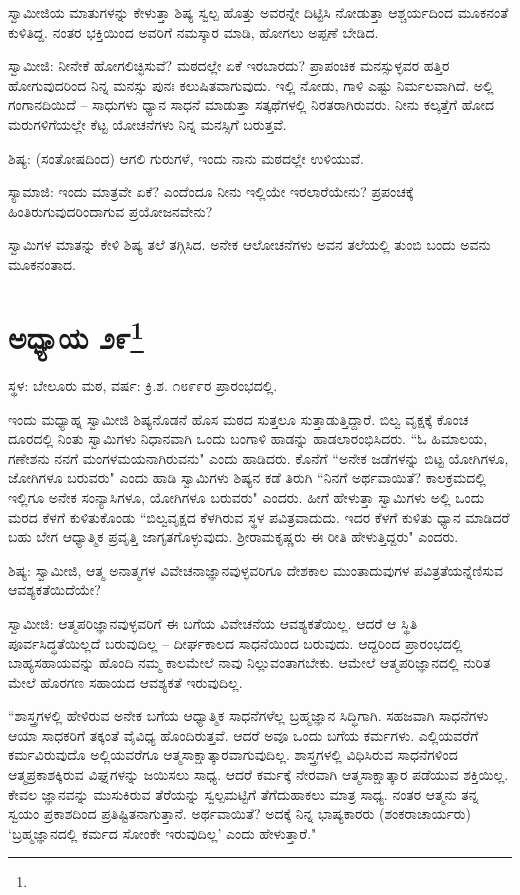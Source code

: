 ಸ್ವಾಮೀಜಿಯ ಮಾತುಗಳನ್ನು ಕೇಳುತ್ತಾ ಶಿಷ್ಯ ಸ್ವಲ್ಪ ಹೊತ್ತು ಅವರನ್ನೇ ದಿಟ್ಟಿಸಿ ನೋಡುತ್ತಾ ಆಶ್ಚರ್ಯದಿಂದ ಮೂಕನಂತೆ ಕುಳಿತಿದ್ದ. ನಂತರ ಭಕ್ತಿಯಿಂದ ಅವರಿಗೆ ನಮಸ್ಕಾರ ಮಾಡಿ, ಹೋಗಲು ಅಪ್ಪಣೆ ಬೇಡಿದ.

ಸ್ವಾಮೀಜಿ: ನೀನೇಕೆ ಹೋಗಲಿಚ್ಛಿಸುವೆ? ಮಠದಲ್ಲೇ ಏಕೆ ಇರಬಾರದು? ಪ್ರಾಪಂಚಿಕ ಮನಸ್ಸುಳ್ಳವರ ಹತ್ತಿರ ಹೋಗುವುದರಿಂದ ನಿನ್ನ ಮನಸ್ಸು ಪುನಃ ಕಲುಷಿತವಾಗುವುದು. ಇಲ್ಲಿ ನೋಡು, ಗಾಳಿ ಎಷ್ಟು ನಿರ್ಮಲವಾಗಿದೆ. ಅಲ್ಲಿ ಗಂಗಾನದಿಯಿದೆ – ಸಾಧುಗಳು ಧ್ಯಾನ ಸಾಧನೆ ಮಾಡುತ್ತಾ ಸತ್ಕಥೆಗಳಲ್ಲಿ ನಿರತರಾಗಿರುವರು. ನೀನು ಕಲ್ಕತ್ತೆಗೆ ಹೋದ ಮರುಗಳಿಗೆಯಲ್ಲೇ ಕೆಟ್ಟ ಯೋಚನೆಗಳು ನಿನ್ನ ಮನಸ್ಸಿಗೆ ಬರುತ್ತವೆ.

ಶಿಷ್ಯ: (ಸಂತೋಷದಿಂದ) ಆಗಲಿ ಗುರುಗಳೆ, ಇಂದು ನಾನು ಮಠದಲ್ಲೇ ಉಳಿಯುವೆ.

ಸ್ಯಾಮಾಜಿ: ಇಂದು ಮಾತ್ರವೇ ಏಕೆ? ಎಂದೆಂದೂ ನೀನು ಇಲ್ಲಿಯೇ ಇರಲಾರೆಯೇನು? ಪ್ರಪಂಚಕ್ಕೆ ಹಿಂತಿರುಗುವುದರಿಂದಾಗುವ ಪ್ರಯೋಜನವೇನು?

ಸ್ವಾಮಿಗಳ ಮಾತನ್ನು ಕೇಳಿ ಶಿಷ್ಯ ತಲೆ ತಗ್ಗಿಸಿದ. ಅನೇಕ ಆಲೋಚನೆಗಳು ಅವನ ತಲೆಯಲ್ಲಿ ತುಂಬಿ ಬಂದು ಅವನು ಮೂಕನಂತಾದ.

\newpage

\chapter[ಅಧ್ಯಾಯ ೨೯]{ಅಧ್ಯಾಯ ೨೯\protect\footnote{}}

\centerline{ಸ್ಥಳ: ಬೇಲೂರು ಮಠ, ವರ್ಷ: ಕ್ರಿ.ಶ. ೧೮೯೯ರ ಪ್ರಾರಂಭದಲ್ಲಿ.}

ಇಂದು ಮಧ್ಯಾಹ್ನ ಸ್ವಾಮೀಜಿ ಶಿಷ್ಯನೊಡನೆ ಹೊಸ ಮಠದ ಸುತ್ತಲೂ ಸುತ್ತಾಡುತ್ತಿದ್ದಾರೆ. ಬಿಲ್ವ ವೃಕ್ಷಕ್ಕೆ ಕೊಂಚ ದೂರದಲ್ಲಿ ನಿಂತು ಸ್ವಾಮಿಗಳು ನಿಧಾನವಾಗಿ ಒಂದು ಬಂಗಾಳಿ ಹಾಡನ್ನು ಹಾಡಲಾರಂಭಿಸಿದರು. “ಓ ಹಿಮಾಲಯ, ಗಣೇಶನು ನನಗೆ ಮಂಗಳಮಯನಾಗಿರುವನು" ಎಂದು ಹಾಡಿದರು. ಕೊನೆಗೆ “ಅನೇಕ ಜಡೆಗಳನ್ನು ಬಿಟ್ಟ ಯೋಗಿಗಳೂ, ಜೋಗಿಗಳೂ ಬರುವರು" ಎಂದು ಹಾಡಿ ಸ್ವಾಮಿಗಳು ಶಿಷ್ಯನ ಕಡೆ ತಿರುಗಿ “ನಿನಗೆ ಅರ್ಥವಾಯಿತೆ? ಕಾಲಕ್ರಮದಲ್ಲಿ ಇಲ್ಲಿಗೂ ಅನೇಕ ಸಂನ್ಯಾಸಿಗಳೂ, ಯೋಗಿಗಳೂ ಬರುವರು" ಎಂದರು. ಹೀಗೆ ಹೇಳುತ್ತಾ ಸ್ವಾಮಿಗಳು ಅಲ್ಲಿ ಒಂದು ಮರದ ಕೆಳಗೆ ಕುಳಿತುಕೊಂಡು “ಬಿಲ್ವವೃಕ್ಷದ ಕೆಳಗಿರುವ ಸ್ಥಳ ಪವಿತ್ರವಾದುದು. ಇದರ ಕೆಳಗೆ ಕುಳಿತು ಧ್ಯಾನ ಮಾಡಿದರೆ ಬಹು ಬೇಗ ಆಧ್ಯಾತ್ಮಿಕ ಪ್ರವೃತ್ತಿ ಜಾಗೃತಗೊಳ್ಳುವುದು. ಶ‍್ರೀರಾಮಕೃಷ್ಣರು ಈ ರೀತಿ ಹೇಳುತ್ತಿದ್ದರು" ಎಂದರು.

ಶಿಷ್ಯ: ಸ್ವಾಮೀಜಿ, ಆತ್ಮ ಅನಾತ್ಮಗಳ ವಿವೇಚನಾಜ್ಞಾನವುಳ್ಳವರಿಗೂ ದೇಶಕಾಲ ಮುಂತಾದುವುಗಳ ಪವಿತ್ರತೆಯನ್ನೆಣಿಸುವ ಆವಶ್ಯಕತೆಯಿದೆಯೇ?

ಸ್ವಾಮೀಜಿ: ಆತ್ಮಪರಿಜ್ಞಾನವುಳ್ಳವರಿಗೆ ಈ ಬಗೆಯ ವಿವೇಚನೆಯ ಆವಶ್ಯಕತೆಯಿಲ್ಲ. ಆದರೆ ಆ ಸ್ಥಿತಿ ಪೂರ್ವಸಿದ್ಧತೆಯಿಲ್ಲದೆ ಬರುವುದಿಲ್ಲ – ದೀರ್ಘಕಾಲದ ಸಾಧನೆಯಿಂದ ಬರುವುದು. ಆದ್ದರಿಂದ ಪ್ರಾರಂಭದಲ್ಲಿ ಬಾಹ್ಯಸಹಾಯವನ್ನು ಹೊಂದಿ ನಮ್ಮ ಕಾಲಮೇಲೆ ನಾವು ನಿಲ್ಲುವಂತಾಗಬೇಕು. ಆಮೇಲೆ ಆತ್ಮಪರಿಜ್ಞಾನದಲ್ಲಿ ನುರಿತ ಮೇಲೆ ಹೊರಗಣ ಸಹಾಯದ ಆವಶ್ಯಕತೆ ಇರುವುದಿಲ್ಲ.

“ಶಾಸ್ತ್ರಗಳಲ್ಲಿ ಹೇಳಿರುವ ಅನೇಕ ಬಗೆಯ ಆಧ್ಯಾತ್ಮಿಕ ಸಾಧನೆಗಳೆಲ್ಲ ಬ್ರಹ್ಮಜ್ಞಾನ ಸಿದ್ಧಿಗಾಗಿ. ಸಹಜವಾಗಿ ಸಾಧನೆಗಳು ಆಯಾ ಸಾಧಕರಿಗೆ ತಕ್ಕಂತೆ ವೈವಿಧ್ಯ ಹೊಂದಿರುತ್ತವೆ. ಆದರೆ ಅವೂ ಒಂದು ಬಗೆಯ ಕರ್ಮಗಳು. ಎಲ್ಲಿಯವರೆಗೆ ಕರ್ಮವಿರುವುದೊ ಅಲ್ಲಿಯವರೆಗೂ ಆತ್ಮಸಾಕ್ಷಾತ್ಕಾರವಾಗುವುದಿಲ್ಲ. ಶಾಸ್ತ್ರಗಳಲ್ಲಿ ವಿಧಿಸಿರುವ ಸಾಧನೆಗಳಿಂದ ಆತ್ಮಪ್ರಕಾಶಕ್ಕಿರುವ ವಿಘ್ನಗಳನ್ನು ಜಯಿಸಲು ಸಾಧ್ಯ. ಆದರೆ ಕರ್ಮಕ್ಕೆ ನೇರವಾಗಿ ಆತ್ಮಸಾಕ್ಷಾತ್ಕಾರ ಪಡೆಯುವ ಶಕ್ತಿಯಿಲ್ಲ. ಕೇವಲ ಜ್ಞಾನವನ್ನು ಮುಸುಕಿರುವ ತೆರೆಯನ್ನು ಸ್ವಲ್ಪಮಟ್ಟಿಗೆ ತೆಗೆದುಹಾಕಲು ಮಾತ್ರ ಸಾಧ್ಯ. ನಂತರ ಆತ್ಮನು ತನ್ನ ಸ್ವಯಂ ಪ್ರಕಾಶದಿಂದ ಪ್ರತಿಷ್ಟಿತನಾಗುತ್ತಾನೆ. ಅರ್ಥವಾಯಿತೆ? ಅದಕ್ಕೆ ನಿನ್ನ ಭಾಷ್ಯಕಾರರು (ಶಂಕರಾಚಾರ್ಯರು) ‘ಬ್ರಹ್ಮಜ್ಞಾನದಲ್ಲಿ ಕರ್ಮದ ಸೋಂಕೇ ಇರುವುದಿಲ್ಲ’ ಎಂದು ಹೇಳುತ್ತಾರೆ."

